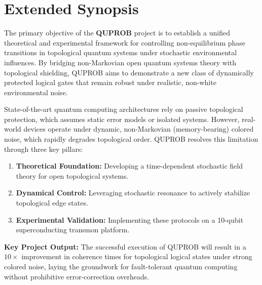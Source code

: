 \section*{Extended Synopsis}

The primary objective of the \textbf{QUPROB} project is to establish a unified theoretical and experimental framework for controlling non-equilibrium phase transitions in topological quantum systems under stochastic environmental influences. By bridging non-Markovian open quantum systems theory with topological shielding, QUPROB aims to demonstrate a new class of dynamically protected logical gates that remain robust under realistic, non-white environmental noise.

\pbreak
State-of-the-art quantum computing architectures rely on passive topological protection, which assumes static error models or isolated systems. However, real-world devices operate under dynamic, non-Markovian (memory-bearing) colored noise, which rapidly degrades topological order. QUPROB resolves this limitation through three key pillars:
\begin{enumerate}[label=\textbf{\arabic*.}, leftmargin=2em]
    \item \textbf{Theoretical Foundation:} Developing a time-dependent stochastic field theory for open topological systems.
    \item \textbf{Dynamical Control:} Leveraging stochastic resonance to actively stabilize topological edge states.
    \item \textbf{Experimental Validation:} Implementing these protocols on a 10-qubit superconducting transmon platform.
\end{enumerate}

\pbreak
\begin{highlightbox}
\textbf{Key Project Output:} The successful execution of QUPROB will result in a $10\times$ improvement in coherence times for topological logical states under strong colored noise, laying the groundwork for fault-tolerant quantum computing without prohibitive error-correction overheads.
\end{highlightbox}

\vspace{1.0em}
